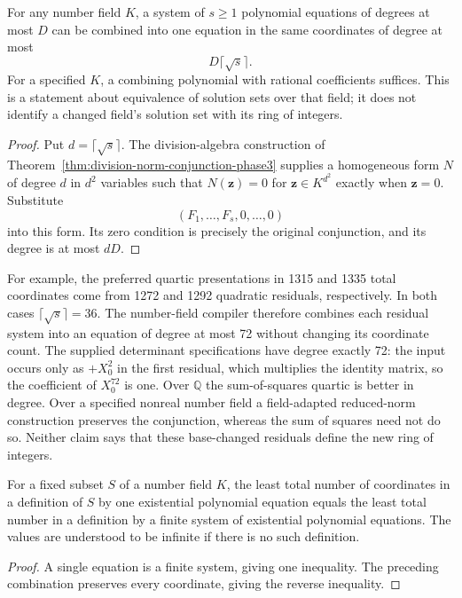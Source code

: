 \begin{corollary}\label{p3sys:division-combination}
For any number field $K$, a system of $s\ge1$ polynomial equations
of degrees at most $D$ can be combined into one equation in the
same coordinates of degree at most
\[
                         D\lceil\sqrt{s}\rceil.
\]
For a specified $K$, a combining polynomial with rational
coefficients suffices.  This is a statement about equivalence
of solution sets over that field; it does not identify a changed
field's solution set with its ring of integers.
\end{corollary}
\begin{proof}
Put $d=\lceil\sqrt{s}\rceil$.  The division-algebra construction
of Theorem~\ref{thm:division-norm-conjunction-phase3} supplies a
homogeneous form $N$ of degree $d$ in $d^2$ variables such that
$N(\mathbf z)=0$ for $\mathbf z\in K^{d^2}$ exactly when
$\mathbf z=0$.  Substitute
\[
                         (F_1,\ldots,F_s,0,\ldots,0)
\]
into this form.  Its zero condition is precisely the original
conjunction, and its degree is at most $dD$.
\end{proof}

For example, the preferred quartic presentations in 1315 and 1335
total coordinates come from 1272 and 1292 quadratic residuals,
respectively.  In both cases $\lceil\sqrt{s}\rceil=36$.
The number-field compiler therefore combines each residual system
into an equation of degree at most 72 without changing its
coordinate count.  The supplied determinant specifications have
degree exactly 72: the input occurs only as $+X_0^2$ in the
first residual, which multiplies the identity matrix, so the
coefficient of $X_0^{72}$ is one.  Over $\mathbb Q$ the
sum-of-squares quartic is better in degree.  Over a specified
nonreal number field a field-adapted reduced-norm construction preserves the
conjunction, whereas the sum of squares need not do so.  Neither
claim says that these base-changed residuals define the new ring
of integers.

\begin{corollary}\label{p3sys:minimum-variable-equality}
For a fixed subset $S$ of a number field $K$, the least total
number of coordinates in a definition of $S$ by one existential
polynomial equation equals the least total number in a definition
by a finite system of existential polynomial equations.  The
values are understood to be infinite if there is no such
definition.
\end{corollary}
\begin{proof}
A single equation is a finite system, giving one inequality.
The preceding combination preserves every coordinate, giving
the reverse inequality.
\end{proof}

